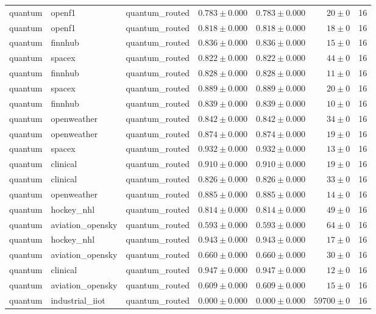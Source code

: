 \begin{table}[htbp]
\begin{tabular}{l l l r r r r}
quantum & openf1 & quantum\_routed & $0.783\pm0.000$ & $0.783\pm0.000$ & $20\pm0$ & 16 \\
quantum & openf1 & quantum\_routed & $0.818\pm0.000$ & $0.818\pm0.000$ & $18\pm0$ & 16 \\
quantum & finnhub & quantum\_routed & $0.836\pm0.000$ & $0.836\pm0.000$ & $15\pm0$ & 16 \\
quantum & spacex & quantum\_routed & $0.822\pm0.000$ & $0.822\pm0.000$ & $44\pm0$ & 16 \\
quantum & finnhub & quantum\_routed & $0.828\pm0.000$ & $0.828\pm0.000$ & $11\pm0$ & 16 \\
quantum & spacex & quantum\_routed & $0.889\pm0.000$ & $0.889\pm0.000$ & $20\pm0$ & 16 \\
quantum & finnhub & quantum\_routed & $0.839\pm0.000$ & $0.839\pm0.000$ & $10\pm0$ & 16 \\
quantum & openweather & quantum\_routed & $0.842\pm0.000$ & $0.842\pm0.000$ & $34\pm0$ & 16 \\
quantum & openweather & quantum\_routed & $0.874\pm0.000$ & $0.874\pm0.000$ & $19\pm0$ & 16 \\
quantum & spacex & quantum\_routed & $0.932\pm0.000$ & $0.932\pm0.000$ & $13\pm0$ & 16 \\
quantum & clinical & quantum\_routed & $0.910\pm0.000$ & $0.910\pm0.000$ & $19\pm0$ & 16 \\
quantum & clinical & quantum\_routed & $0.826\pm0.000$ & $0.826\pm0.000$ & $33\pm0$ & 16 \\
quantum & openweather & quantum\_routed & $0.885\pm0.000$ & $0.885\pm0.000$ & $14\pm0$ & 16 \\
quantum & hockey\_nhl & quantum\_routed & $0.814\pm0.000$ & $0.814\pm0.000$ & $49\pm0$ & 16 \\
quantum & aviation\_opensky & quantum\_routed & $0.593\pm0.000$ & $0.593\pm0.000$ & $64\pm0$ & 16 \\
quantum & hockey\_nhl & quantum\_routed & $0.943\pm0.000$ & $0.943\pm0.000$ & $17\pm0$ & 16 \\
quantum & aviation\_opensky & quantum\_routed & $0.660\pm0.000$ & $0.660\pm0.000$ & $30\pm0$ & 16 \\
quantum & clinical & quantum\_routed & $0.947\pm0.000$ & $0.947\pm0.000$ & $12\pm0$ & 16 \\
quantum & aviation\_opensky & quantum\_routed & $0.609\pm0.000$ & $0.609\pm0.000$ & $15\pm0$ & 16 \\
quantum & industrial\_iiot & quantum\_routed & $0.000\pm0.000$ & $0.000\pm0.000$ & $59700\pm0$ & 16 \\

\end{tabular}
\end{table}
